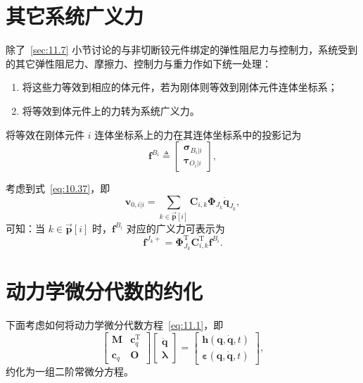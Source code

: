 \section{其它系统广义力}

除了~\ref{sec:11.7} 小节讨论的与非切断铰元件绑定的弹性阻尼力与控制力，系统受到的其它弹性阻尼力、摩擦力、控制力与重力作如下统一处理：
\begin{enumerate}
\item 将这些力等效到相应的体元件，若为刚体则等效到刚体元件连体坐标系；
\item 将等效到体元件上的力转为系统广义力。
\end{enumerate}

将等效在刚体元件 $i$ 连体坐标系上的力在其连体坐标系中的投影记为
\begin{equation}\label{eq:11.27}
\boldsymbol{f}^{B_i} \triangleq \begin{bmatrix}
\boldsymbol{\sigma}_{B_i|i} \\[4pt]
\boldsymbol{\tau}_{O_i|i}
\end{bmatrix},
\end{equation}

考虑到式~\eqref{eq:10.37}，即
\begin{equation}\label{eq:11.28}
\boldsymbol{v}_{0,i|i} = \sum_{k \in \vec{\boldsymbol{p}}[i]} \boldsymbol{C}_{i,k} \boldsymbol{\Phi}_{J_k} \dot{\boldsymbol{q}}_{J_k},
\end{equation}
可知：当 $k \in \vec{\boldsymbol{p}}[i]$ 时，$\boldsymbol{f}^{B_i}$ 对应的广义力可表示为
\begin{equation}\label{eq:11.29}
\boldsymbol{f}^{J_k+} = \boldsymbol{\Phi}_{J_k}^{\mathrm{T}} \boldsymbol{C}_{i,k}^{\mathrm{T}} \boldsymbol{f}^{B_i}.
\end{equation}

\section{动力学微分代数的约化}

下面考虑如何将动力学微分代数方程~\eqref{eq:11.1}，即
\begin{equation*}
\begin{bmatrix}
\boldsymbol{M} & \boldsymbol{c}_{q}^{\mathrm{T}} \\[4pt]
\boldsymbol{c}_{q} & \boldsymbol{O}
\end{bmatrix}
\begin{bmatrix}
\ddot{\boldsymbol{q}} \\[4pt]
\boldsymbol{\lambda}
\end{bmatrix}
=
\begin{bmatrix}
\boldsymbol{h}(\boldsymbol{q}, \dot{\boldsymbol{q}}, t) \\[4pt]
\boldsymbol{\varepsilon}(\boldsymbol{q}, \dot{\boldsymbol{q}}, t)
\end{bmatrix},
\end{equation*}
约化为一组二阶常微分方程。

